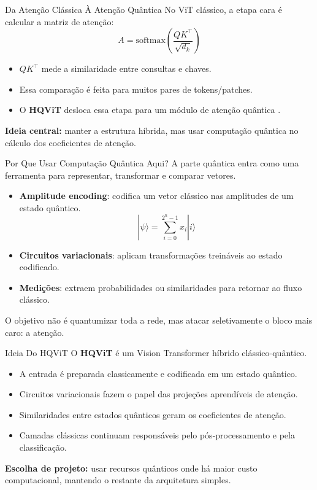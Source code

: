 \begin{frame}{Da Atenção Clássica À Atenção Quântica}
    No ViT clássico, a etapa cara é calcular a matriz de atenção:
    \[
        A = \text{softmax}\!\left(\frac{QK^\top}{\sqrt{d_k}}\right)
    \]
    \begin{itemize}
        \item $QK^\top$ mede a similaridade entre consultas e chaves.
        \item Essa comparação é feita para muitos pares de tokens/patches.
        \item O \textbf{HQViT} desloca essa etapa para um módulo de atenção quântica \cite{zhang2025hqvit}.
    \end{itemize}
    \vspace{0.4em}
    \textbf{Ideia central:} manter a estrutura híbrida, mas usar computação quântica no cálculo dos coeficientes de atenção.
\end{frame}

\begin{frame}{Por Que Usar Computação Quântica Aqui?}
    A parte quântica entra como uma ferramenta para representar, transformar e comparar vetores.
    \begin{itemize}
        \item \textbf{Amplitude encoding}: codifica um vetor clássico nas amplitudes de um estado quântico.
        \[
            |\psi\rangle = \sum_{i=0}^{2^n - 1} x_i |i\rangle
        \]
        \item \textbf{Circuitos variacionais}: aplicam transformações treináveis ao estado codificado.
        \item \textbf{Medições}: extraem probabilidades ou similaridades para retornar ao fluxo clássico.
    \end{itemize}
    \vspace{0.3em}
    O objetivo não é quantumizar toda a rede, mas atacar seletivamente o bloco mais caro: a atenção.
\end{frame}

\begin{frame}{Ideia Do HQViT}
    O \textbf{HQViT} é um Vision Transformer híbrido clássico-quântico.
    \begin{itemize}
        \item A entrada é preparada classicamente e codificada em um estado quântico.
        \item Circuitos variacionais fazem o papel das projeções aprendíveis de atenção.
        \item Similaridades entre estados quânticos geram os coeficientes de atenção.
        \item Camadas clássicas continuam responsáveis pelo pós-processamento e pela classificação.
    \end{itemize}
    \vspace{0.4em}
    \textbf{Escolha de projeto:} usar recursos quânticos onde há maior custo computacional, mantendo o restante da arquitetura simples.
\end{frame}


